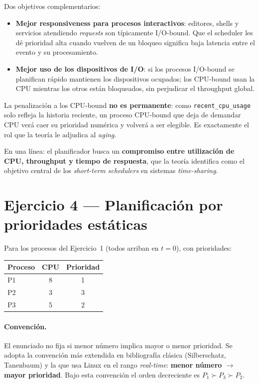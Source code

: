 \documentclass[11pt,a4paper]{article}
\begin{document}
Dos objetivos complementarios:

\begin{itemize}[leftmargin=*,nosep]
    \item \textbf{Mejor responsiveness para procesos interactivos}:
        editores, shells y servicios atendiendo \emph{requests} son
        típicamente I/O-bound. Que el scheduler les dé prioridad alta
        cuando vuelven de un bloqueo significa baja latencia entre el
        evento y su procesamiento.
    \item \textbf{Mejor uso de los dispositivos de I/O}: si los
        procesos I/O-bound se planifican rápido mantienen los
        dispositivos ocupados; los CPU-bound usan la CPU mientras los
        otros están bloqueados, sin perjudicar el throughput global.
\end{itemize}

La penalización a los CPU-bound \textbf{no es permanente}: como
\texttt{recent\_cpu\_usage} solo refleja la historia reciente, un
proceso CPU-bound que deja de demandar CPU verá caer su prioridad
numérica y volverá a ser elegible. Es exactamente el rol que la
teoría le adjudica al \emph{aging}.

En una línea: el planificador busca un \textbf{compromiso entre
utilización de CPU, throughput y tiempo de respuesta}, que la teoría
identifica como el objetivo central de los \emph{short-term
schedulers} en sistemas \emph{time-sharing}.

\section{Ejercicio 4 --- Planificación por prioridades estáticas}

Para los procesos del Ejercicio~1 (todos arriban en $t = 0$), con
prioridades:

\begin{center}
\small
\begin{tabular}{@{}lcc@{}}
\toprule
Proceso & CPU & Prioridad \\
\midrule
P1 & 8 & 1 \\
P2 & 3 & 3 \\
P3 & 5 & 2 \\
\bottomrule
\end{tabular}
\end{center}

\paragraph{Convención.} El enunciado no fija si menor número implica
mayor o menor prioridad. Se adopta la convención más extendida en
bibliografía clásica (Silberschatz, Tanenbaum) y la que usa Linux en
el rango \emph{real-time}: \textbf{menor número $\to$ mayor
prioridad}. Bajo esta convención el orden decreciente es
$P_1 \succ P_3 \succ P_2$.
\end{document}
